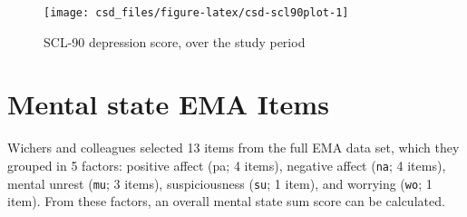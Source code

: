 \documentclass[]{book}
\begin{document}
\begin{figure}

{\centering \texttt{[image: csd\_files/figure-latex/csd-scl90plot-1]} 

}

\caption{SCL-90 depression score, over the study period}\label{fig:csd-scl90plot}
\end{figure}

\section{Mental state EMA Items}\label{mental-state-ema-items}

Wichers and colleagues selected 13 items from the full EMA data set,
which they grouped in 5 factors: positive affect (pa; 4 items), negative
affect (\texttt{na}; 4 items), mental unrest (\texttt{mu}; 3 items),
suspiciousness (\texttt{su}; 1 item), and worrying (\texttt{wo}; 1
item). From these factors, an overall mental state sum score can be
calculated.
\end{document}
